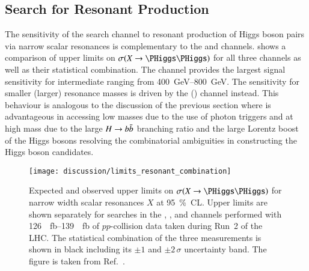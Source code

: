 

\subsection{Search for Resonant \HH Production}

The sensitivity of the \bbtautau search channel to resonant production of Higgs
boson pairs via narrow scalar resonances is complementary to the \bbyy and \bbbb
channels.  shows a comparison of upper limits
on $\sigma(X \to \HH)$ for all three channels as well as their statistical
combination. The \bbtautau channel provides the largest signal sensitivity for
intermediate \mX ranging from \SIrange{400}{800}{\GeV}. The sensitivity for
smaller (larger) resonance masses is driven by the \bbyy (\bbbb) channel
instead. This behaviour is analogous to the discussion of the previous section
where \bbyy is advantageous in accessing low masses due to the use of photon
triggers and \bbbb at high mass due to the large $H \to b\bar{b}$ branching ratio
and the large Lorentz boost of the Higgs bosons resolving the combinatorial
ambiguities in constructing the Higgs boson candidates.

\begin{figure}[htbp]
  \centering

  \texttt{[image: discussion/limits\_resonant\_combination]}

  \caption{Expected and observed upper limits on $\sigma(X \to \HH)$ for narrow
    width scalar resonances $X$ at \SI{95}{\percent}~CL. Upper limits are shown
    separately for searches in the \bbbb, \bbtautau, and \bbyy channels
    performed with \SIrange{126}{139}{\per\femto\barn} of $pp$-collision data
    taken during Run~2 of the LHC. The statistical combination of the three
    measurements is shown in black including its $\pm 1$ and $\pm 2\,\sigma$
    uncertainty band. The figure is taken from
    Ref.~\cite{ATLAS-CONF-2021-052}.}%
  \label{fig:resonant_hh_comb_limits}
\end{figure}


